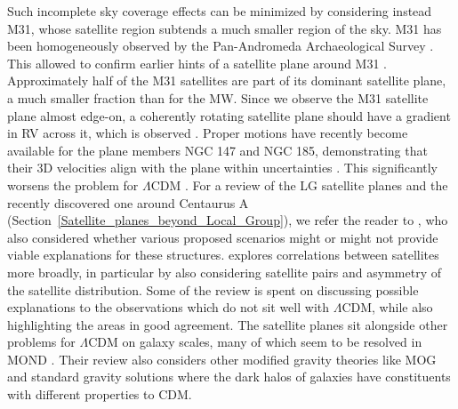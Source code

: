 \documentclass[fleqn,usenatbib,useAMS,onecolumn]{mnras} %
\begin{document}
Such incomplete sky coverage effects can be minimized by considering instead M31, whose satellite region subtends a much smaller region of the sky. M31 has been homogeneously observed by the Pan-Andromeda Archaeological Survey \citep{McConnachie_2009, McConnachie_2018}. This allowed \citet{Ibata_2013} to confirm earlier hints of a satellite plane around M31 \citep{Metz_2007}. Approximately half of the M31 satellites are part of its dominant satellite plane, a much smaller fraction than for the MW. Since we observe the M31 satellite plane almost edge-on, a coherently rotating satellite plane should have a gradient in RV across it, which is observed \citep{Ibata_2013}. Proper motions have recently become available for the plane members NGC 147 and NGC 185, demonstrating that their 3D velocities align with the plane within uncertainties \citep{Sohn_2020}. This significantly worsens the problem for $\Lambda$CDM \citep{Pawlowski_Sohn_2021}. For a review of the LG satellite planes and the recently discovered one around Centaurus A (Section~\ref{Satellite_planes_beyond_Local_Group}), we refer the reader to \citet{Pawlowski_2018}, who also considered whether various proposed scenarios might or might not provide viable explanations for these structures. \citet{Pawlowski_2021} explores correlations between satellites more broadly, in particular by also considering satellite pairs and asymmetry of the satellite distribution. Some of the review is spent on discussing possible explanations to the observations which do not sit well with $\Lambda$CDM, while also highlighting the areas in good agreement. The satellite planes sit alongside other problems for $\Lambda$CDM on galaxy scales, many of which seem to be resolved in MOND \citep{Martino_2020}. Their review also considers other modified gravity theories like MOG and standard gravity solutions where the dark halos of galaxies have constituents with different properties to CDM.
\end{document}
